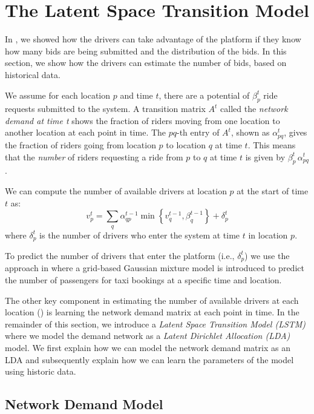 \section{The Latent Space Transition Model}
\label{sec:stmodel}

In , we showed how the drivers can take advantage of the platform if they know how many bids are being submitted and the distribution of the bids. In this section, we show how the drivers can estimate the number of bids, based on historical data.

We assume for each location $p$ and time $t$, there are a potential of $\beta_{p}^t$ ride requests submitted to the system. A transition matrix $A^t$ called the \emph{network demand at time t} shows the fraction of riders moving from one location to another location at each point in time. The $pq$-th entry of $A^t$, shown as $\alpha_{pq}^t$, gives the fraction of riders going from location $p$ to location $q$ at time $t$. This means that the \emph{number} of riders requesting a ride from $p$ to $q$ at time $t$ is given by $\beta_p^t\,\alpha_{pq}^t$.

We can compute the number of available drivers at location $p$ at the start of time $t$ as:
\begin{equation}
\label{eq:drivers}
v_p^t = \sum_q \alpha_{qp}^{t-1} \min \left\lbrace v_q^{t-1}, \beta_q^{t-1} \right\rbrace  + \delta_p^t
\end{equation}
where $\delta_p^t$ is the number of drivers who enter the system at time $t$ in location $p$.

To predict the number of drivers that enter the platform (i.e., $\delta_p^t$) we use the approach in \cite{Chiang15} where  a grid-based Gaussian mixture model is introduced to predict the number of passengers for taxi bookings at a specific time and location.

The other key component in estimating the number of available drivers at each location () is learning the network demand matrix at each point in time. In the remainder of this section, we introduce a \emph{Latent Space Transition Model (LSTM)} where we model the demand network as a \emph{Latent Dirichlet Allocation (LDA)}\cite{Blei03} model. We first explain how we can model the network demand matrix as an LDA and subsequently explain how we can learn the parameters of the model using historic data.

\subsection{Network Demand Model}
\label{subsec:model}

